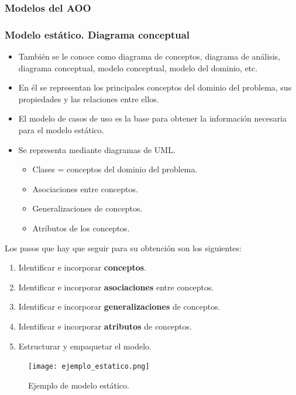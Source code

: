 \documentclass[12pt,spanish]{article}
\begin{document}
\subsubsection{Modelos del AOO}

\subsubsection{Modelo estático. Diagrama conceptual}

\begin{itemize}
	\item También se le conoce como diagrama de conceptos, diagrama de análisis, diagrama conceptual, modelo conceptual, modelo del dominio, etc.
	\item En él se representan los principales conceptos del dominio del problema, sus propiedades y las relaciones entre ellos. 
	\item El modelo de casos de uso es la base para obtener la información necesaria para el modelo estático.
	\item Se representa mediante diagramas de UML.
		\begin{itemize}
			\item Clases = conceptos del dominio del problema.
			\item Asociaciones entre conceptos.
			\item Generalizaciones de conceptos.
			\item Atributos de los conceptos.
		\end{itemize}
\end{itemize}

Los pasos que hay que seguir para su obtención son los siguientes:

\begin{enumerate}
	\item Identificar e incorporar \textbf{conceptos}.
	\item Identificar e incorporar \textbf{asociaciones} entre conceptos.
	\item Identificar e incorporar \textbf{generalizaciones} de conceptos.
	\item Identificar e incorporar \textbf{atributos} de conceptos.
	\item Estructurar y empaquetar el modelo.
	\end{enumerate}
	
\begin{figure}[H]
\centering
\texttt{[image: ejemplo\_estatico.png]}
\caption{Ejemplo de modelo estático.}
\end{figure}
\end{document}
